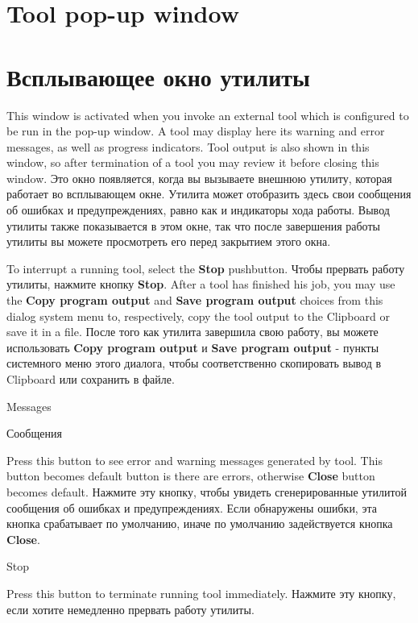 \ifenglish
\section{Tool pop-up window}
\else
\section{Всплывающее окно утилиты}
\fi
{}

\ifenglish
This window is activated when you invoke an external tool which is
configured to be run in the pop-up window. A tool may display here
its warning and error messages, as well as progress indicators.
Tool output is also shown in this window, so after termination of a tool
you may review it before closing this window.
\else
Это окно появляется, когда вы вызываете внешнюю утилиту, которая работает во 
всплывающем окне. Утилита может отобразить здесь свои сообщения об ошибках и 
предупреждениях, равно как и индикаторы хода работы.
Вывод утилиты также показывается в этом окне, так что после завершения работы 
утилиты вы можете просмотреть его перед закрытием этого окна. 
\fi

\ifenglish
To interrupt a running tool, select the {\bf Stop} pushbutton.
\else
Чтобы прервать работу утилиты, нажмите кнопку {\bf Stop}.
\fi
\ifenglish
After a tool has finished his job, you may use the {\bf Copy program output}
and {\bf Save program output} choices from this dialog system menu to,
respectively, copy the tool output to the Clipboard or save it in a file.
\else
После того как утилита завершила свою работу, вы можете использовать
{\bf Copy program output} и {\bf Save program output} - пункты системного меню 
этого диалога, чтобы соответственно скопировать вывод в Clipboard или сохранить 
в файле.
\fi
\begin{popup}
\ifenglish
\caption{Messages}
\else
\caption{Сообщения}
\fi
{}

\ifenglish
Press this button to see error and warning messages generated by tool.
This button becomes default button is there are errors, otherwise
{\bf Close} button becomes default.
\else
Нажмите эту кнопку, чтобы увидеть сгенерированные утилитой сообщения об ошибках 
и предупреждениях. Если обнаружены ошибки, эта кнопка срабатывает по умолчанию,
иначе по умолчанию задействуется кнопка {\bf Close}.
\fi

\end{popup}


\begin{popup}
\caption{Stop}

\ifenglish
Press this button to terminate running tool immediately.
\else
Нажмите эту кнопку, если хотите немедленно прервать работу утилиты.
\fi
\end{popup}


